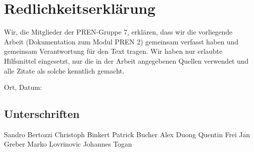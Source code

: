 \documentclass[a4paper,12pt]{scrartcl}
\begin{document}
\setlength{\parindent}{0pt}

\section*{Redlichkeitserklärung}

Wir, die Mitglieder der PREN-Gruppe 7, erklären, dass  wir die vorliegende Arbeit (Dokumentation zum Modul PREN 2) gemeinsam verfasst haben und  gemeinsam Verantwortung für den Text tragen. Wir haben nur erlaubte Hilfsmittel eingesetzt, nur die in der Arbeit angegebenen Quellen verwendet und alle Zitate als solche kenntlich gemacht.

\vskip 14pt

Ort, Datum:

\vskip 14pt

\dotfill

\subsection*{Unterschriften}

\begin{multicols}{2}
\vskip 14pt
Sandro Bertozzi
\vskip 14pt
\dotfill
\vskip 14pt
Christoph Binkert
\vskip 14pt
\dotfill
\vskip 14pt
Patrick Bucher
\vskip 14pt
\dotfill
\vskip 14pt
Alex Duong
\vskip 14pt
\dotfill
\vskip 14pt
\columnbreak
Quentin Frei
\vskip 14pt
\dotfill
\vskip 14pt
Jan Greber
\vskip 14pt
\dotfill
\vskip 14pt
Marko Lovrinovic
\vskip 14pt
\dotfill
\vskip 14pt
Johannes Togan
\vskip 14pt
\dotfill
\end{multicols}
\end{document}
